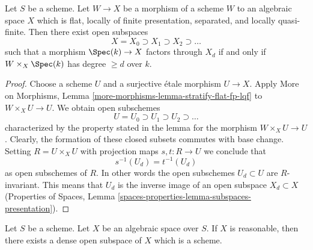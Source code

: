 \begin{lemma}
\label{lemma-stratify-flat-fp-lqf}
Let $S$ be a scheme. Let $W \to X$ be a morphism of a scheme $W$ to an
algebraic space $X$ which is flat, locally of finite presentation,
separated, and locally quasi-finite. Then there
exist open subspaces
$$
X = X_0 \supset X_1 \supset X_2 \supset \ldots
$$
such that a morphism $\Spec(k) \to X$ factors through $X_d$ if and
only if $W \times_X \Spec(k)$ has degree $\geq d$ over $k$.
\end{lemma}

\begin{proof}
Choose a scheme $U$ and a surjective \'etale morphism $U \to X$. Apply
More on Morphisms, Lemma \ref{more-morphisms-lemma-stratify-flat-fp-lqf}
to $W \times_X U \to U$. We obtain open subschemes
$$
U = U_0 \supset U_1 \supset U_2 \supset \ldots
$$
characterized by the property stated in the lemma for the morphism
$W \times_X U \to U$. Clearly, the formation of these closed subsets commutes
with base change. Setting $R = U \times_X U$ with projection maps
$s, t : R \to U$ we conclude that
$$
s^{-1}(U_d) = t^{-1}(U_d)
$$
as open subschemes of $R$. In other words the open subschemes $U_d \subset U$
are $R$-invariant. This means that $U_d$ is the inverse image of an
open subspace $X_d \subset X$
(Properties of Spaces, Lemma
\ref{spaces-properties-lemma-subspaces-presentation}).
\end{proof}

\begin{proposition}
\label{proposition-reasonable-open-dense-scheme}
Let $S$ be a scheme. Let $X$ be an algebraic space over $S$.
If $X$ is reasonable, then there exists a dense open subspace
of $X$ which is a scheme.
\end{proposition}

